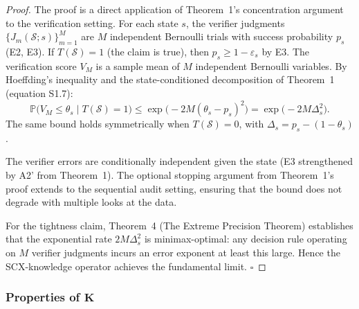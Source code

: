 \begin{proof}
The proof is a direct application of Theorem~1's concentration argument
to the verification setting. For each state $s$, the verifier judgments
$\{J_m(\mathcal{S}; s)\}_{m=1}^M$ are $M$ independent Bernoulli trials
with success probability $p_s$ (E2, E3). If $T(\mathcal{S})=1$ (the claim
is true), then $p_s \geq 1-\varepsilon_s$ by E3. The verification score
$V_M$ is a sample mean of $M$ independent Bernoulli variables.
By Hoeffding's inequality and the state-conditioned decomposition of
Theorem~1 (equation S1.7):
\[
\mathbb{P}\bigl(V_M \leq \theta_s \mid T(\mathcal{S})=1\bigr)
  \leq \exp\bigl(-2M(\theta_s - p_s)^2\bigr)
  = \exp\bigl(-2M\Delta_s^2\bigr).
\]
The same bound holds symmetrically when $T(\mathcal{S})=0$, with
$\Delta_s = p_s - (1-\theta_s)$.

The verifier errors are conditionally independent given the state (E3
strengthened by A2' from Theorem~1). The optional stopping argument from
Theorem~1's proof extends to the sequential audit setting, ensuring that
the bound does not degrade with multiple looks at the data.

For the tightness claim, Theorem~4 (The Extreme Precision Theorem) establishes that the
exponential rate $2M\Delta_s^2$ is minimax-optimal: any decision rule
operating on $M$ verifier judgments incurs an error exponent at least
this large. Hence the SCX-knowledge operator achieves the fundamental
limit. $\square$
\end{proof}

\subsubsection{Properties of $\mathbf{K}$}
\label{sec:K-properties}


